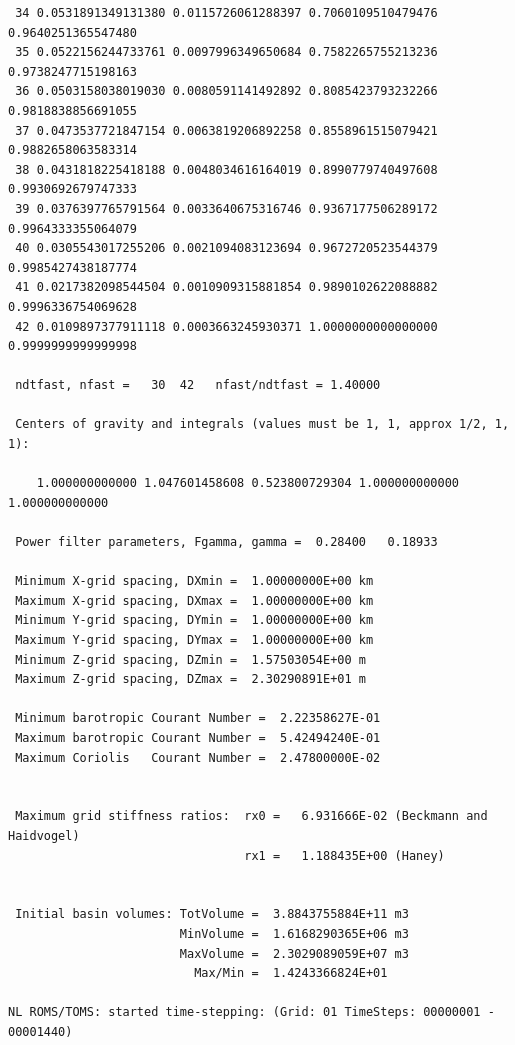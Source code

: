 \begin{verbatim}
 34 0.0531891349131380 0.0115726061288397 0.7060109510479476 0.9640251365547480
 35 0.0522156244733761 0.0097996349650684 0.7582265755213236 0.9738247715198163
 36 0.0503158038019030 0.0080591141492892 0.8085423793232266 0.9818838856691055
 37 0.0473537721847154 0.0063819206892258 0.8558961515079421 0.9882658063583314
 38 0.0431818225418188 0.0048034616164019 0.8990779740497608 0.9930692679747333
 39 0.0376397765791564 0.0033640675316746 0.9367177506289172 0.9964333355064079
 40 0.0305543017255206 0.0021094083123694 0.9672720523544379 0.9985427438187774
 41 0.0217382098544504 0.0010909315881854 0.9890102622088882 0.9996336754069628
 42 0.0109897377911118 0.0003663245930371 1.0000000000000000 0.9999999999999998

 ndtfast, nfast =   30  42   nfast/ndtfast = 1.40000

 Centers of gravity and integrals (values must be 1, 1, approx 1/2, 1, 1):

    1.000000000000 1.047601458608 0.523800729304 1.000000000000 1.000000000000

 Power filter parameters, Fgamma, gamma =  0.28400   0.18933

 Minimum X-grid spacing, DXmin =  1.00000000E+00 km
 Maximum X-grid spacing, DXmax =  1.00000000E+00 km
 Minimum Y-grid spacing, DYmin =  1.00000000E+00 km
 Maximum Y-grid spacing, DYmax =  1.00000000E+00 km
 Minimum Z-grid spacing, DZmin =  1.57503054E+00 m
 Maximum Z-grid spacing, DZmax =  2.30290891E+01 m

 Minimum barotropic Courant Number =  2.22358627E-01
 Maximum barotropic Courant Number =  5.42494240E-01
 Maximum Coriolis   Courant Number =  2.47800000E-02


 Maximum grid stiffness ratios:  rx0 =   6.931666E-02 (Beckmann and Haidvogel)
                                 rx1 =   1.188435E+00 (Haney)


 Initial basin volumes: TotVolume =  3.8843755884E+11 m3
                        MinVolume =  1.6168290365E+06 m3
                        MaxVolume =  2.3029089059E+07 m3
                          Max/Min =  1.4243366824E+01

NL ROMS/TOMS: started time-stepping: (Grid: 01 TimeSteps: 00000001 - 00001440)


\end{verbatim}
